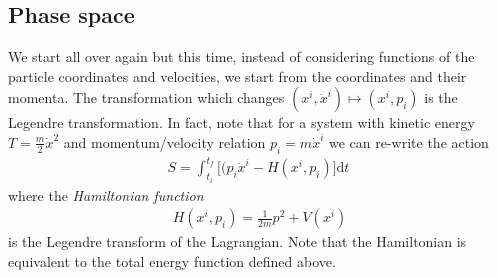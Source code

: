 \documentclass[12pt]{article}
\begin{document}
\subsection{Phase space}

We start all over again but this time, instead of considering functions of the particle coordinates and velocities, we start from the coordinates and their momenta. The transformation which changes $(x^i, \dot x^i)\mapsto (x^i, p_i)$ is the Legendre transformation. In fact, note that for a system with kinetic energy $T=\frac m2 \dot x^2$ and momentum/velocity relation $p_i=m\dot x^i$ we can re-write the action 
\begin{eqnarray}
S=\int_{t_i}^{t_f} \Big[(p_i \dot  x^i-H(x^i, p_i)\Big]\mathrm d t~
\end{eqnarray}
where the {\em Hamiltonian function}
\begin{eqnarray}
H(x^i, p_i)=\frac 1{2m}p^2+V(x^i)
\end{eqnarray}
is the Legendre transform of the Lagrangian. Note that the Hamiltonian is equivalent to the total energy function defined above.
\end{document}
